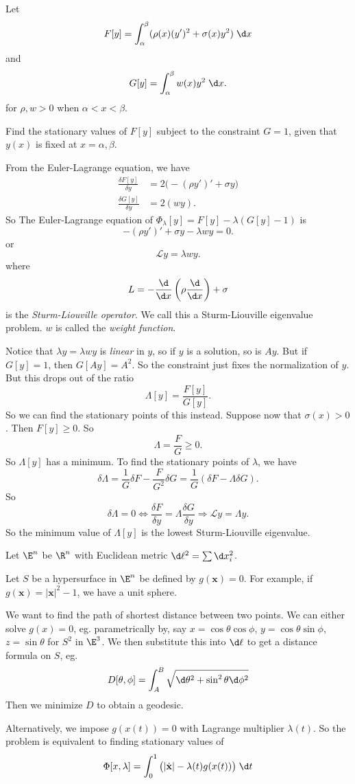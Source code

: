 \documentclass[a4paper]{article}
\begin{document}
\begin{eg}
  Let
  \[
    F[y] = \int_\alpha^\beta (\rho(x)(y')^2 + \sigma(x)y^2)\;\d x
  \]
  and
  \[
    G[y] = \int_\alpha^\beta w(x)y^2\;\d x.
  \]
  for $\rho, w> 0$ when $\alpha < x < \beta$.

  Find the stationary values of $F[y]$ subject to the constraint $G = 1$, given that $y(x)$ is fixed at $x = \alpha, \beta$.

  From the Euler-Lagrange equation, we have
  \begin{align*}
    \frac{\delta F[y]}{\delta y} &= 2\big(-(\rho y')' + \sigma y\big)\\
    \frac{\delta G[y]}{\delta y} &= 2 (wy).
  \end{align*}
  So The Euler-Lagrange equation of $\Phi_\lambda [y] = F[y] - \lambda(G[y] - 1)$ is
  \[
    -(\rho y')' + \sigma y - \lambda wy = 0.
  \]
  or
  \[
    \mathcal{L}y = \lambda wy.
  \]
  where
  \[
    L = -\frac{\d}{\d x}\left(\rho\frac{\d}{\d x}\right) + \sigma
  \]
  is the \emph{Sturm-Liouville operator}. We call this a Sturm-Liouville eigenvalue problem. $w$ is called the \emph{weight function}.

  Notice that $\lambda y = \lambda wy$ is \emph{linear} in $y$, so if $y$ is a solution, so is $Ay$. But if $G[y ] = 1$, then $G[Ay] = A^2$. So the constraint just fixes the normalization of $y$. But this drops out of the ratio
  \[
    \Lambda [y] = \frac{F[y]}{G[y]}.
  \]
  So we can find the stationary points of this instead. Suppose now that $\sigma(x) > 0$. Then $F[y] \geq 0$. So
 \[
    \Lambda = \frac{F}{G} \geq 0.
  \]
  So $\Lambda[y]$ has a minimum. To find the stationary points of $\lambda$, we have
  \[
    \delta\Lambda = \frac{1}{G}\delta F - \frac{F}{G^2} \delta G = \frac{1}{G}(\delta F - \Lambda \delta G).
  \]
  So
  \[
    \delta \Lambda = 0 \Leftrightarrow \frac{\delta F}{\delta y} = \Lambda \frac{\delta G}{\delta y} \Rightarrow \mathcal{L} y = \Lambda y.
  \]
  So the minimum value of $\Lambda[y]$ is the lowest Sturm-Liouville eigenvalue.
\end{eg}

\begin{eg}
  Let $\E^n$ be $\R^n$ with Euclidean metric $\d \ell^2 = \sum \d x_i^2$.

  Let $S$ be a hypersurface in $\E^n$ be defined by $g(\mathbf{x}) = 0$. For example, if $g(\mathbf{x}) = |\mathbf{x}|^2 - 1$, we have a unit sphere.

  We want to find the path of shortest distance between two points. We can either solve $g(x) = 0$, eg. parametrically by, say $x = \cos \theta \cos \phi$, $y = \cos \theta \sin \phi$, $z = \sin \theta$ for $S^2$ in $\E^3$. We then substitute this into $\d \ell$ to get a distance formula on $S$, eg.
  \[
    D[\theta, \phi] = \int_A^B \sqrt{\d \theta^2 + \sin^2 \theta \d \phi^2}
  \]
  Then we minimize $D$ to obtain a geodesic.

  Alternatively, we impose $g(x(t)) = 0$ with Lagrange multiplier $\lambda(t)$. So the problem is equivalent to finding stationary values of
  \[
    \Phi[x, \lambda] = \int_0^1 \big(|\dot{\mathbf{x}}| - \lambda(t) g(x(t))\big)\;\d t
  \]
\end{eg}
\end{document}
